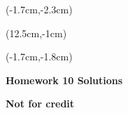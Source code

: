 \documentclass[12pt, oneside]{article}
\begin{document}
\begin{textblock*}{4cm}(-1.7cm,-2.3cm)
\end{textblock*}

\begin{textblock*}{8cm}(12.5cm,-1cm)
\end{textblock*}
\begin{textblock*}{13.5cm}(-1.7cm,-1.8cm)
\end{textblock*}

\vspace{1cm}

\begin{center}
\textbf{\Large Homework 10 Solutions}

\textbf{Not for credit}
\end{center}
\end{document}
